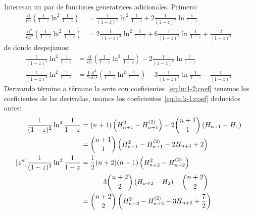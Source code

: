   Interesan un par de funciones generatrices adicionales.
  Primero:
  \begin{align*}
    \frac{\mathrm{d}}{\mathrm{d} z}
      \left( \frac{1}{1 - z} \ln^2 \frac{1}{1 - z} \right)
      &= \frac{1}{(1 - z)^2} \ln^2 \frac{1}{1 - z}
	   + 2 \frac{1}{(1 - z)^2} \ln \frac{1}{1 - z} \\
    \frac{\mathrm{d}^2}{\mathrm{d} z^2}
      \left( \frac{1}{1 - z} \ln^2 \frac{1}{1 - z} \right)
      &= 2 \frac{1}{(1 - z)^3} \ln^2 \frac{1}{1 - z}
	   + 6 \frac{1}{(1 - z)^3} \ln \frac{1}{1 - z}
	   + \frac{2}{(1 - z)^3}
  \end{align*}
  de donde despejamos:
  \begin{align*}
    \frac{1}{(1 - z)^2} \ln^2 \frac{1}{1 - z}
      &= \frac{\mathrm{d}}{\mathrm{d} z}
	   \left( \frac{1}{1 - z} \ln^2 \frac{1}{1 - z} \right)
	   - 2 \frac{1}{(1 - z)^2} \ln \frac{1}{1 - z} \\
    \frac{1}{(1 - z)^3} \ln^2 \frac{1}{1 - z}
      &=  \frac{1}{2} \frac{\mathrm{d}^2}{\mathrm{d} z^2}
			\left( \frac{1}{1 - z} \ln^2 \frac{1}{1 - z} \right)
	   - 3 \frac{1}{(1 - z)^3} \ln \frac{1}{1 - z}
	   - \frac{1}{(1 - z)^3}
  \end{align*}
  Derivando término a término
  la serie con coeficientes~\eqref{eq:ln:1-2:coef}
  tenemos los coeficientes de las derivadas,
  usamos los coeficientes~\eqref{eq:ln:k-1:coef} deducidos antes:
  \begin{align}
    [z^n] \frac{1}{(1 - z)^2} \ln^2 \frac{1}{1 - z}
      &= (n + 1) \left( H^2_{n + 1} - H^{(2)}_{n + 1} \right)
	  - 2 \binom{n + 1}{1} \left( H_{n + 1} - H_1 \right) \notag \\
      &= \binom{n + 1}{1}
	   \left(
	     H^2_{n + 1} - H^{(2)}_{n + 1} - 2 H_{n + 1} + 2
	   \right) \label{eq:ln:2-2:coef} \\
    [z^n] \frac{1}{(1 - z)^3} \ln^2 \frac{1}{1 - z}
      &= \frac{1}{2} (n + 2) (n + 1)
	   \left( H^2_{n + 2} - H^{(2)}_{n + 2} \right) \notag \\
	   &\qquad
	   - 3 \binom{n + 2}{2}
	       \left(
		 H_{n + 2}
		   - H_2
	       \right) \notag
	   - \binom{n + 2}{2} \notag \\
      &= \binom{n + 2}{2}
	   \left(
	     H^2_{n + 2} - H^{(2)}_{n + 2}
	       - 3 H_{n + 2} + \frac{7}{2}
	   \right)
  \end{align}

